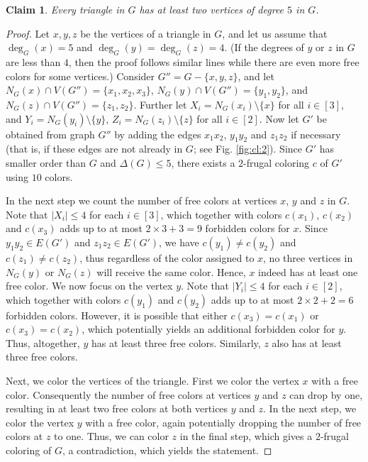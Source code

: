 \documentclass[10pt,a4paper]{article}
\newtheorem{claim}{Claim}
\begin{document}
\begin{claim} Every triangle in $G$ has at least two vertices of degree $5$ in $G$.
\label{cl:2}
\end{claim} 
\begin{proof}
Let $x,y,z$ be the vertices of a triangle in $G$, and let us assume that $\deg_G(x)=5$ and $\deg_G(y)=\deg_G(z)=4$. (If the degrees of $y$ or $z$ in $G$ are less than $4$, then the proof follows similar lines while there are even more free colors for some vertices.) Consider $G''=G-\{x,y,z\}$, and let $N_G(x) \cap V(G'')=\{x_1,x_2,x_3\}$, $N_G(y) \cap V(G'')=\{y_1,y_2\}$, and $N_G(z) \cap V(G'')=\{z_1,z_2\}$. Further let $X_i=N_G(x_i)\setminus\{x\}$ for all $i\in[3]$, and $Y_i=N_G(y_i)\setminus\{y\}$, $Z_i=N_G(z_i)\setminus\{z\}$ for all $i \in [2]$. Now let $G'$ be obtained from graph $G''$ by adding the edges $x_1x_2$, $y_1y_2$ and $z_1z_2$ if necessary (that is, if these edges are not already in $G$; see Fig. \ref{fig:cl:2}). Since $G'$ has smaller order than $G$ and $\Delta(G)\le 5$, there exists a $2$-frugal coloring $c$ of $G'$ using $10$ colors.

In the next step we count the number of free colors at vertices $x$, $y$ and $z$ in $G$. Note that $|X_i| \le 4$ for each $i\in [3]$, which together with colors $c(x_1)$, $c(x_2)$ and $c(x_3)$ adds up to at most $2 \times 3 + 3=9$ forbidden colors for $x$. Since $y_1y_2 \in E(G')$ and $z_1z_2 \in E(G')$, we have $c(y_1) \ne c(y_2)$ and $c(z_1) \ne c(z_2)$, thus regardless of the color assigned to $x$, no three vertices in $N_G(y)$ or $N_G(z)$ will receive the same color. Hence, $x$ indeed has at least one free color. We now focus on the vertex $y$. Note that $|Y_i| \le 4$ for each $i\in [2]$, which together with colors $c(y_1)$ and $c(y_2)$ adds up to at most $2 \times 2 +2=6$ forbidden colors. However, it is possible that either $c(x_3)=c(x_1)$ or $c(x_3)=c(x_2)$, which potentially yields an additional forbidden color for $y$. Thus, altogether, $y$ has at least three free colors. Similarly, $z$ also has at least three free colors.

Next, we color the vertices of the triangle. First we color the vertex $x$ with a free color. Consequently the number of free colors at vertices $y$ and $z$ can drop by one, resulting in at least two free colors at both vertices $y$ and $z$. In the next step, we color the vertex $y$ with a free color, again potentially dropping the number of free colors at $z$ to one. Thus, we can color $z$ in the final step, which gives a $2$-frugal coloring of $G$, a contradiction, which yields the statement.
\end{proof}
\end{document}
